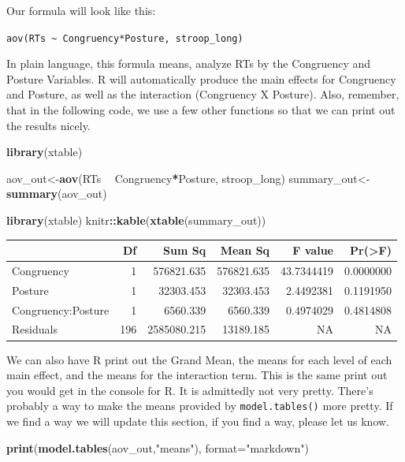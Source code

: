 \documentclass[]{book}
\newenvironment{Shaded}{\begin{snugshade}}{\end{snugshade}}
\newcommand{\KeywordTok}[1]{\textcolor[rgb]{0.13,0.29,0.53}{\textbf{#1}}}
\newcommand{\DataTypeTok}[1]{\textcolor[rgb]{0.13,0.29,0.53}{#1}}
\newcommand{\StringTok}[1]{\textcolor[rgb]{0.31,0.60,0.02}{#1}}
\newcommand{\OperatorTok}[1]{\textcolor[rgb]{0.81,0.36,0.00}{\textbf{#1}}}
\newcommand{\NormalTok}[1]{#1}
\begin{document}
Our formula will look like this:

\texttt{aov(RTs\ \textasciitilde{}\ Congruency*Posture,\ stroop\_long)}

In plain language, this formula means, analyze RTs by the Congruency and
Posture Variables. R will automatically produce the main effects for
Congruency and Posture, as well as the interaction (Congruency X
Posture). Also, remember, that in the following code, we use a few other
functions so that we can print out the results nicely.

\begin{Shaded}
\begin{Highlighting}[]
\KeywordTok{library}\NormalTok{(xtable)}

\NormalTok{aov_out<-}\KeywordTok{aov}\NormalTok{(RTs }\OperatorTok{~}\StringTok{ }\NormalTok{Congruency}\OperatorTok{*}\NormalTok{Posture, stroop_long)}
\NormalTok{summary_out<-}\KeywordTok{summary}\NormalTok{(aov_out)}

\KeywordTok{library}\NormalTok{(xtable)}
\NormalTok{knitr}\OperatorTok{::}\KeywordTok{kable}\NormalTok{(}\KeywordTok{xtable}\NormalTok{(summary_out))}
\end{Highlighting}
\end{Shaded}

\begin{tabular}{l|r|r|r|r|r}
\hline
  & Df & Sum Sq & Mean Sq & F value & Pr(>F)\\
\hline
Congruency & 1 & 576821.635 & 576821.635 & 43.7344419 & 0.0000000\\
\hline
Posture & 1 & 32303.453 & 32303.453 & 2.4492381 & 0.1191950\\
\hline
Congruency:Posture & 1 & 6560.339 & 6560.339 & 0.4974029 & 0.4814808\\
\hline
Residuals & 196 & 2585080.215 & 13189.185 & NA & NA\\
\hline
\end{tabular}

We can also have R print out the Grand Mean, the means for each level of
each main effect, and the means for the interaction term. This is the
same print out you would get in the console for R. It is admittedly not
very pretty. There's probably a way to make the means provided by
\texttt{model.tables()} more pretty. If we find a way we will update
this section, if you find a way, please let us know.

\begin{Shaded}
\begin{Highlighting}[]
\KeywordTok{print}\NormalTok{(}\KeywordTok{model.tables}\NormalTok{(aov_out,}\StringTok{"means"}\NormalTok{), }\DataTypeTok{format=}\StringTok{"markdown"}\NormalTok{)}
\end{Highlighting}
\end{Shaded}
\end{document}
